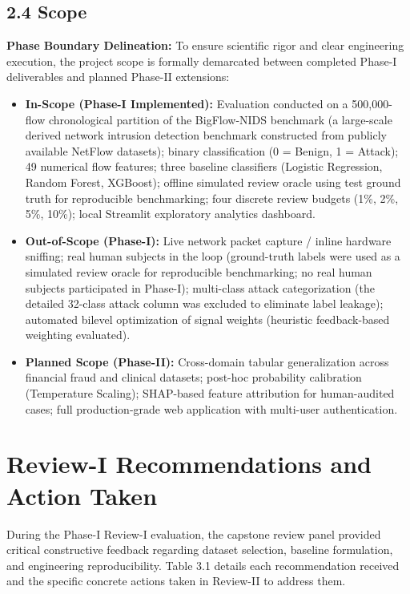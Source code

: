 \subsection{2.4 Scope}

\textbf{Phase Boundary Delineation:} To ensure scientific rigor and clear engineering execution, the project scope is formally demarcated between completed Phase-I deliverables and planned Phase-II extensions:

\begin{itemize}
\item \textbf{In-Scope (Phase-I Implemented):} Evaluation conducted on a 500,000-flow chronological partition of the BigFlow-NIDS benchmark (a large-scale derived network intrusion detection benchmark constructed from publicly available NetFlow datasets); binary classification (0 = Benign, 1 = Attack); 49 numerical flow features; three baseline classifiers (Logistic Regression, Random Forest, XGBoost); offline simulated review oracle using test ground truth for reproducible benchmarking; four discrete review budgets (1\%, 2\%, 5\%, 10\%); local Streamlit exploratory analytics dashboard.
\item \textbf{Out-of-Scope (Phase-I):} Live network packet capture / inline hardware sniffing; real human subjects in the loop (ground-truth labels were used as a simulated review oracle for reproducible benchmarking; no real human subjects participated in Phase-I); multi-class attack categorization (the detailed 32-class attack column was excluded to eliminate label leakage); automated bilevel optimization of signal weights (heuristic feedback-based weighting evaluated).
\item \textbf{Planned Scope (Phase-II):} Cross-domain tabular generalization across financial fraud and clinical datasets; post-hoc probability calibration (Temperature Scaling); SHAP-based feature attribution for human-audited cases; full production-grade web application with multi-user authentication.
\end{itemize}

\section{Review-I Recommendations and Action Taken}

During the Phase-I Review-I evaluation, the capstone review panel provided critical constructive feedback regarding dataset selection, baseline formulation, and engineering reproducibility. Table 3.1 details each recommendation received and the specific concrete actions taken in Review-II to address them.

